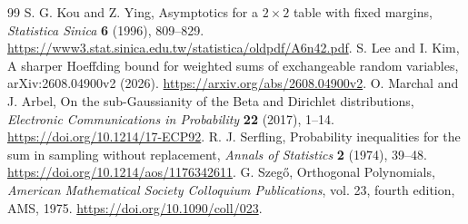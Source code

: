 \documentclass[11pt,a4paper]{article}
\begin{document}
\begin{thebibliography}{99}
 S. G. Kou and Z. Ying, Asymptotics for a $2\times2$ table with fixed margins, \emph{Statistica Sinica} \textbf{6} (1996), 809--829. \url{https://www3.stat.sinica.edu.tw/statistica/oldpdf/A6n42.pdf}.
 S. Lee and I. Kim, A sharper Hoeffding bound for weighted sums of exchangeable random variables, arXiv:2608.04900v2 (2026). \url{https://arxiv.org/abs/2608.04900v2}.
 O. Marchal and J. Arbel, On the sub-Gaussianity of the Beta and Dirichlet distributions, \emph{Electronic Communications in Probability} \textbf{22} (2017), 1--14. \url{https://doi.org/10.1214/17-ECP92}.
 R. J. Serfling, Probability inequalities for the sum in sampling without replacement, \emph{Annals of Statistics} \textbf{2} (1974), 39--48. \url{https://doi.org/10.1214/aos/1176342611}.
 G. Szeg\H{o}, Orthogonal Polynomials, \emph{American Mathematical Society Colloquium Publications}, vol. 23, fourth edition, AMS, 1975. \url{https://doi.org/10.1090/coll/023}.
\end{thebibliography}

\end{document}

